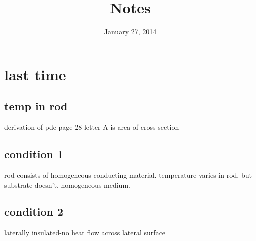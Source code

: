 \documentclass{article}
\begin{document}
\title{Notes}
\date{January 27, 2014}
\maketitle
\section*{last time}
\subsection*{temp in rod}
derivation of pde
page 28
letter A is area of cross section
\subsection*{condition 1}
rod consists of homogeneous conducting material.  temperature varies in rod, but substrate doesn't. homogeneous medium.
\subsection*{condition 2}
laterally insulated-no heat flow across lateral surface
\end{document}

